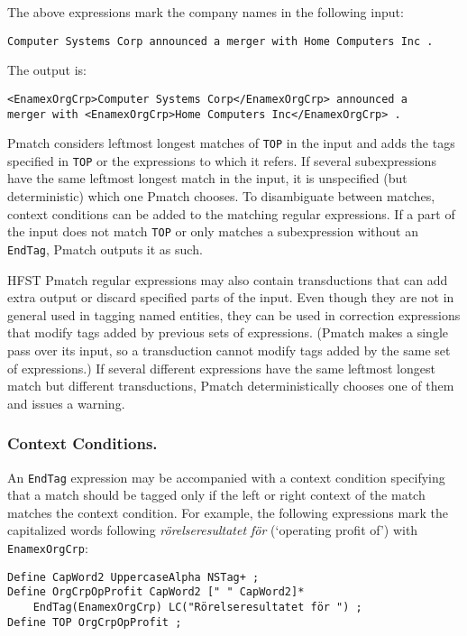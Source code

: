 \documentclass{llncs}
\begin{document}
The above expressions mark the company names in the following input:
\begin{verbatim}
Computer Systems Corp announced a merger with Home Computers Inc .
\end{verbatim}
\noindent
The output is:
\begin{verbatim}
<EnamexOrgCrp>Computer Systems Corp</EnamexOrgCrp> announced a
merger with <EnamexOrgCrp>Home Computers Inc</EnamexOrgCrp> .
\end{verbatim}

Pmatch considers leftmost longest matches of \texttt{TOP} in the input
and adds the tags specified in \texttt{TOP} or the expressions to
which it refers. If several subexpressions have the same leftmost
longest match in the input, it is unspecified (but deterministic)
which one Pmatch
chooses. To disambiguate between matches, context conditions can be
added to the matching regular expressions.
If a part of the input does not match \texttt{TOP} or only matches a
subexpression without an \texttt{EndTag},
Pmatch outputs it as such.

HFST Pmatch regular expressions may also contain transductions that can add
extra output or discard specified parts of the input. Even though they
are not in general used in tagging named entities, they can be
used in correction expressions that modify tags added by previous sets
of expressions. (Pmatch makes a single pass over its input, so a
transduction cannot modify tags added by the same set of expressions.)
If several different expressions have the same leftmost longest match
but different transductions, Pmatch deterministically chooses one of
them and issues a warning.

\subsubsection{Context Conditions.}

An \texttt{EndTag} expression may be accompanied with a context
condition specifying that a match should be tagged only if the
left or right context of the match matches the context condition. For
example, the
following expressions mark the capitalized words following
\textit{rörelseresultatet för} (`operating profit of') with
\texttt{EnamexOrgCrp}:

\begin{verbatim}
Define CapWord2 UppercaseAlpha NSTag+ ;
Define OrgCrpOpProfit CapWord2 [" " CapWord2]*
    EndTag(EnamexOrgCrp) LC("Rörelseresultatet för ") ;
Define TOP OrgCrpOpProfit ;
\end{verbatim}
\end{document}

